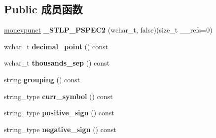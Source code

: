 \subsection*{Public 成员函数}
\begin{DoxyCompactItemize}
\item 
\mbox{\label{classmoneypunct_3_01wchar__t_00_01false_01_4_aaccf024073d60ef0d0bab8ad76566041}} 
\hyperlink{classmoneypunct}{moneypunct} {\bfseries \+\_\+\+S\+T\+L\+P\+\_\+\+P\+S\+P\+E\+C2} (wchar\+\_\+t, false)(size\+\_\+t \+\_\+\+\_\+refs=0)
\item 
\mbox{\label{classmoneypunct_3_01wchar__t_00_01false_01_4_a575a8c51c43625e6fc5c714893d939c9}} 
wchar\+\_\+t {\bfseries decimal\+\_\+point} () const
\item 
\mbox{\label{classmoneypunct_3_01wchar__t_00_01false_01_4_a16eb442189a47a4f6c44f437912c029d}} 
wchar\+\_\+t {\bfseries thousands\+\_\+sep} () const
\item 
\mbox{\label{classmoneypunct_3_01wchar__t_00_01false_01_4_aa2de3737c1fad31eab1ff28706d719b6}} 
\hyperlink{structstring}{string} {\bfseries grouping} () const
\item 
\mbox{\label{classmoneypunct_3_01wchar__t_00_01false_01_4_a93c8aa9dc785a23479b587c18baf651d}} 
string\+\_\+type {\bfseries curr\+\_\+symbol} () const
\item 
\mbox{\label{classmoneypunct_3_01wchar__t_00_01false_01_4_acfd60082724d544b1684c1ce34564fe5}} 
string\+\_\+type {\bfseries positive\+\_\+sign} () const
\item 
\mbox{\label{classmoneypunct_3_01wchar__t_00_01false_01_4_a89d2a0ccdccbb7a730be814830a7ee73}} 
string\+\_\+type {\bfseries negative\+\_\+sign} () const
\item 
\mbox{\label{classmoneypunct_3_01wchar__t_00_01false_01_4_a74fae8c0689297863eb935c1b92a0dda}} 

\end{DoxyCompactItemize}

